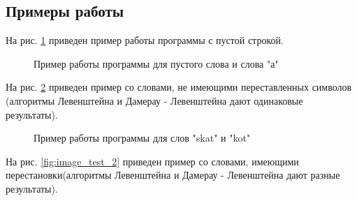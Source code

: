 \documentclass[a4paper,12pt]{article}
\begin{document}
    
    \subsection{Примеры работы}
        
        На рис. \ref{fig:image_test_3} приведен пример работы программы с пустой строкой. 
        	\begin{figure}[h!]
                \caption{Пример работы программы для пустого слова и слова "а"}
                \label{fig:image_test_3}
            \end{figure}
            
         На рис. \ref{fig:image_test_1} приведен пример со словами, не имеющими переставленных символов (алгоритмы Левенштейна и Дамерау - Левенштейна дают одинаковые результаты).
            
            \begin{figure}[h!]
                \caption{Пример работы программы для слов "skat" и "kot"}
                \label{fig:image_test_1}
            \end{figure}
         На рис. \ref{fig:image_test_2} приведен пример со словами, имеющими перестановки(алгоритмы Левенштейна и Дамерау - Левенштейна дают разные результаты).
        
\end{document}
